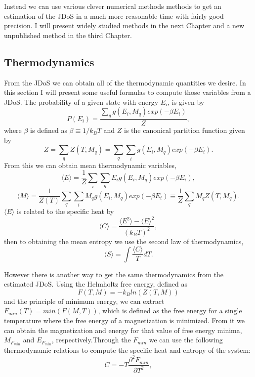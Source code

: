 Instead we can use various clever numerical methods methods to get an estimation of the JDoS in a much more reasonable time with fairly good precision. I will present widely studied methods in the next Chapter and a new unpublished method in the third Chapter.

\subsection{Thermodynamics}

From the JDoS we can obtain all of the thermodynamic quantities we desire. In this section I will present some useful formulas to compute those variables from a JDoS. 
The probability of a given state with energy $E_i$, is given by
\begin{equation}
	P(E_i) = \frac{\sum_q g(E_i, M_q) exp(-\beta E_i)}{Z},
\end{equation}
where $\beta$ is defined as $\beta \equiv 1/k_BT$ and $Z$ is the canonical partition function given by
\begin{equation}
	Z = \sum_q Z(T, M_q) = \sum_q \sum_i g(E_i, M_q) exp(-\beta E_i).
\end{equation}
From this we can obtain mean thermodynamic variables, 
\begin{equation}
	\langle E \rangle = \frac{1}{Z} \sum_i \sum_q E_i g(E_i, M_q) exp(-\beta E_i),
\end{equation}
\begin{equation}
	\langle M \rangle  = \frac{1}{Z(T)} \sum_q \sum_i M_q g(E_i, M_q) exp(-\beta E_i) \equiv \frac{1}{Z} \sum_q M_q Z(T, M_q).
\end{equation}
$\langle E \rangle$ is related to the specific heat by 
\begin{equation}
	\langle C \rangle = \frac{\langle E^2 \rangle - \langle E \rangle^2}{\left( k_BT \right)^2},
\end{equation}
then to obtaining the mean entropy we use the second law of thermodynamics,
\begin{equation}
	\langle S \rangle= \int \frac{\langle C \rangle}{T} dT.
\end{equation}

However there is another way to get the same thermodynamics from the estimated JDoS.  Using the Helmholtz free energy, defined as 
\begin{equation}
	F(T, M) = - k_B ln(Z(T, M))
\end{equation}
and the principle of minimum energy, we can extract $F_{min} (T) = min(F(M, T))$, which is defined as the free energy for a single temperature where the free energy of a magnetization is minimized.
From it we can obtain the magnetization and energy for that value of free energy minima, $M_{F_{min}}$ and $E_{F_{min}}$, respectively.Through the $F_{min}$ we can use the following thermodynamic relations to compute the specific heat and entropy of the system:
\begin{equation}
	C = - T \frac{\partial^2 F_{min}}{\partial T^2},
\end{equation}

